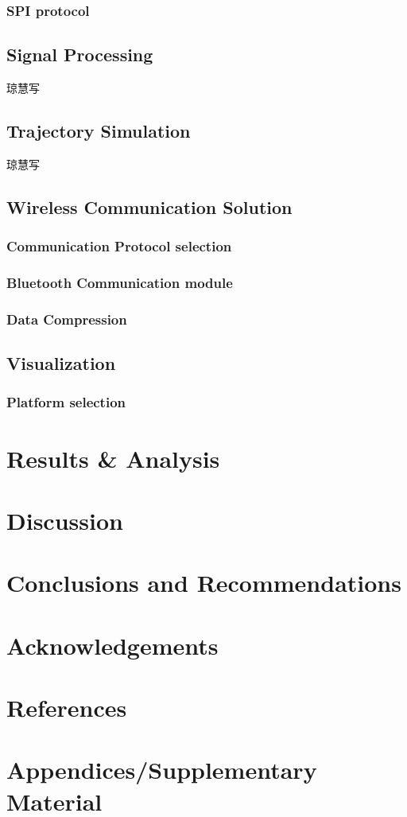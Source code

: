 \subsubsection{SPI protocol}

\subsection{Signal Processing}
琼慧写
\subsection{Trajectory Simulation}
琼慧写
\subsection{Wireless Communication Solution}

\subsubsection{Communication Protocol selection}

\subsubsection{Bluetooth Communication module}


\subsubsection{Data Compression}




\subsection{Visualization}
\subsubsection{Platform selection}





\section{Results \& Analysis}


\section{Discussion}


\section{Conclusions and Recommendations}


\section{Acknowledgements }


\section{References}


\printbibliography[heading=none]


\section{Appendices/Supplementary Material}



